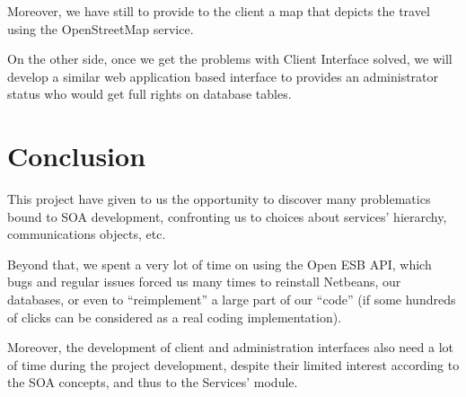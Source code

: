 \documentclass[a4paper]{article}
\begin{document}
		Moreover, we have still to provide to the client a map that depicts the travel using the OpenStreetMap service.
		
		On the other side, once we get the problems with Client Interface solved, we will develop a similar web application based interface to provides an administrator status who would get full rights on database tables.
	\newpage
	\section*{Conclusion}

		This project have given to us the opportunity to discover many problematics bound to SOA development, confronting us to choices about services' hierarchy, communications objects, etc.
		
		Beyond that, we spent a very lot of time on using the Open ESB API, which bugs and regular issues forced us many times to reinstall Netbeans, our databases, or even to ``reimplement'' a large part of our ``code'' (if some hundreds of clicks can be considered as a real coding implementation).
		
		Moreover, the development of client and administration interfaces also need a lot of time during the project development, despite their limited interest according to the SOA concepts, and thus to the Services' module.
\end{document}
